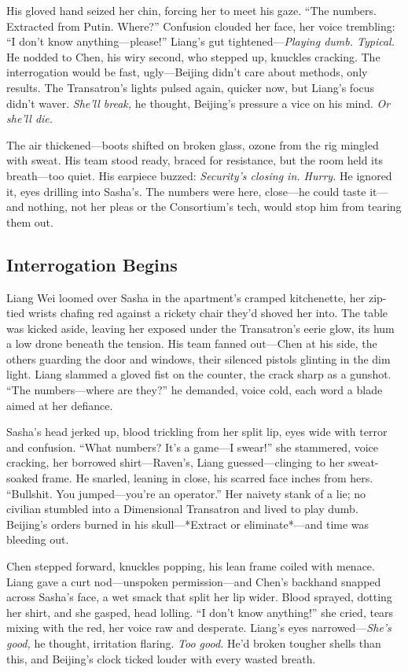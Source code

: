 \documentclass[12pt]{book}
\begin{document}
His gloved hand seized her chin, forcing her to meet his gaze. ``The numbers. Extracted from Putin. Where?'' Confusion clouded her face, her voice trembling: ``I don’t know anything---please!'' Liang’s gut tightened---\textit{Playing dumb. Typical.} He nodded to Chen, his wiry second, who stepped up, knuckles cracking. The interrogation would be fast, ugly---Beijing didn’t care about methods, only results. The Transatron’s lights pulsed again, quicker now, but Liang’s focus didn’t waver. \textit{She’ll break,} he thought, Beijing’s pressure a vice on his mind. \textit{Or she’ll die.}

The air thickened---boots shifted on broken glass, ozone from the rig mingled with sweat. His team stood ready, braced for resistance, but the room held its breath---too quiet. His earpiece buzzed: \textit{Security’s closing in. Hurry.} He ignored it, eyes drilling into Sasha’s. The numbers were here, close---he could taste it---and nothing, not her pleas or the Consortium’s tech, would stop him from tearing them out.

\subsection{Interrogation Begins}

Liang Wei loomed over Sasha in the apartment’s cramped kitchenette, her zip-tied wrists chafing red against a rickety chair they’d shoved her into. The table was kicked aside, leaving her exposed under the Transatron’s eerie glow, its hum a low drone beneath the tension. His team fanned out—Chen at his side, the others guarding the door and windows, their silenced pistols glinting in the dim light. Liang slammed a gloved fist on the counter, the crack sharp as a gunshot. “The numbers—where are they?” he demanded, voice cold, each word a blade aimed at her defiance.

Sasha’s head jerked up, blood trickling from her split lip, eyes wide with terror and confusion. “What numbers? It’s a game—I swear!” she stammered, voice cracking, her borrowed shirt—Raven’s, Liang guessed—clinging to her sweat-soaked frame. He snarled, leaning in close, his scarred face inches from hers. “Bullshit. You jumped—you’re an operator.” Her naivety stank of a lie; no civilian stumbled into a Dimensional Transatron and lived to play dumb. Beijing’s orders burned in his skull—*Extract or eliminate*—and time was bleeding out.

Chen stepped forward, knuckles popping, his lean frame coiled with menace. Liang gave a curt nod—unspoken permission—and Chen’s backhand snapped across Sasha’s face, a wet smack that split her lip wider. Blood sprayed, dotting her shirt, and she gasped, head lolling. “I don’t know anything!” she cried, tears mixing with the red, her voice raw and desperate. Liang’s eyes narrowed—\textit{She’s good,} he thought, irritation flaring. \textit{Too good.} He’d broken tougher shells than this, and Beijing’s clock ticked louder with every wasted breath.
\end{document}
